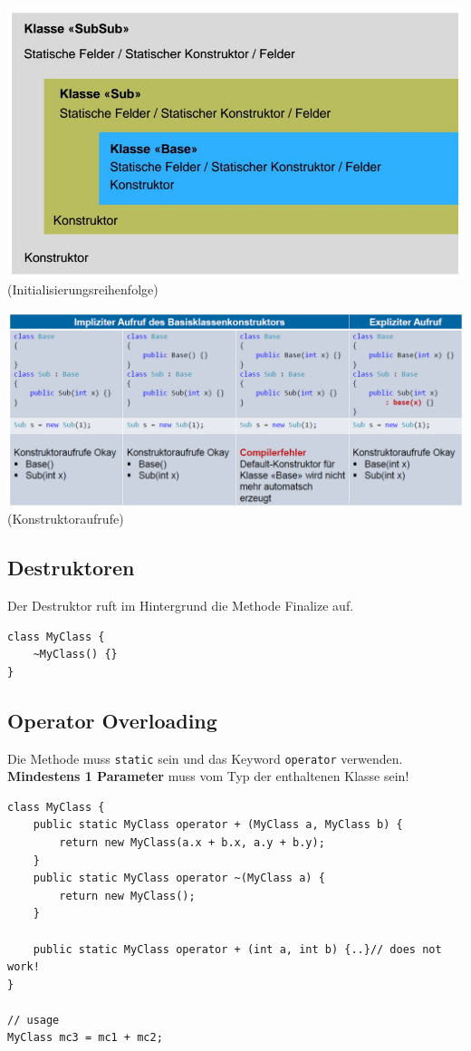 \documentclass[
a4paper,
oneside,
10pt,
fleqn,
headsepline,
toc=listofnumbered, 
bibliography=totocnumbered]{scrartcl}
\begin{document}
\begin{minipage}[t]{1\textwidth}
	\centering
	\includegraphics[width=0.9\linewidth]{images/initialisierungsreihenfolge}
	(Initialisierungsreihenfolge)

\end{minipage}

\begin{minipage}[t]{1\textwidth}
	\centering
	\includegraphics[width=\linewidth]{images/init_constructors}
	(Konstruktoraufrufe)
\end{minipage}

\subsection{Destruktoren}
Der Destruktor ruft im Hintergrund die Methode Finalize auf.
\begin{lstlisting}
class MyClass {
	~MyClass() {}
}
\end{lstlisting}

\subsection{Operator Overloading}
Die Methode muss \lstinline|static| sein und das Keyword \lstinline|operator| verwenden. \textbf{Mindestens 1 Parameter} muss vom Typ der enthaltenen Klasse sein!
\begin{lstlisting}
class MyClass {
	public static MyClass operator + (MyClass a, MyClass b) {
		return new MyClass(a.x + b.x, a.y + b.y);
	}
	public static MyClass operator ~(MyClass a) {
		return new MyClass();
	}
	
	public static MyClass operator + (int a, int b) {..}// does not work!
}

// usage
MyClass mc3 = mc1 + mc2;
\end{lstlisting}
\end{document}
